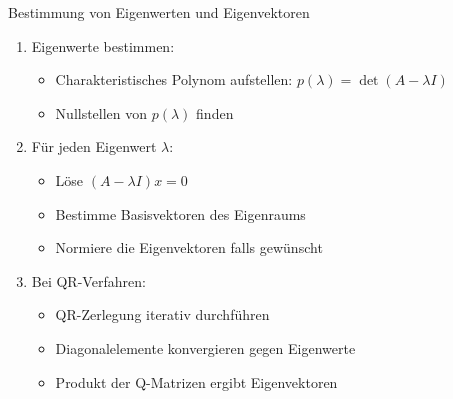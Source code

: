 \begin{KR}{Bestimmung von Eigenwerten und Eigenvektoren}
\begin{enumerate}
    \item Eigenwerte bestimmen:
    \begin{itemize}
        \item Charakteristisches Polynom aufstellen: $p(\lambda) = \det(A-\lambda I)$
        \item Nullstellen von $p(\lambda)$ finden
    \end{itemize}
    
    \item Für jeden Eigenwert $\lambda$:
    \begin{itemize}
        \item Löse $(A-\lambda I)x = 0$ 
        \item Bestimme Basisvektoren des Eigenraums
        \item Normiere die Eigenvektoren falls gewünscht
    \end{itemize}
    
    \item Bei QR-Verfahren:
    \begin{itemize}
        \item QR-Zerlegung iterativ durchführen
        \item Diagonalelemente konvergieren gegen Eigenwerte
        \item Produkt der Q-Matrizen ergibt Eigenvektoren
    \end{itemize}
\end{enumerate}
\end{KR}

